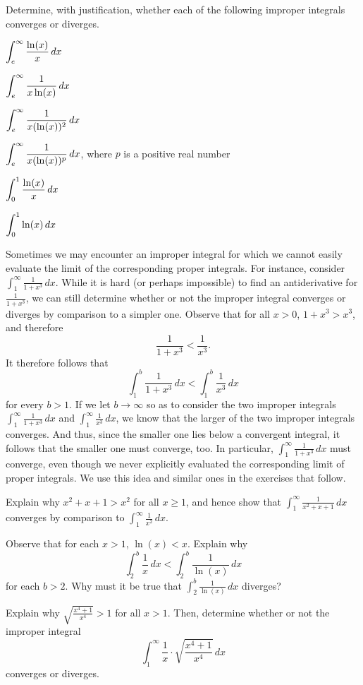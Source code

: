 \begin{exercises} 
  \item Determine, with justification, whether each of the following improper integrals converges or diverges.
  \ba
  	\item $\displaystyle \int_e^{\infty} \frac{\ln(x)}{x} \, dx$
  	\item $\displaystyle \int_e^{\infty} \frac{1}{x\ln(x)} \, dx$
  	\item $\displaystyle \int_e^{\infty} \frac{1}{x(\ln(x))^2} \, dx$	
  	\item $\displaystyle \int_e^{\infty} \frac{1}{x(\ln(x))^p} \, dx$, where $p$ is a positive real number	
	\item $\displaystyle \int_0^1 \frac{\ln(x)}{x} \, dx$
	\item $\displaystyle \int_0^1 \ln(x) \, dx$
  \ea
  
  \item Sometimes we may encounter an improper integral for which we cannot easily evaluate the limit of the corresponding proper integrals.  For instance, consider $\int_1^{\infty} \frac{1}{1+x^3} \, dx$.  While it is hard (or perhaps impossible) to find an antiderivative for $\frac{1}{1+x^3}$, we can still determine whether or not the improper integral converges or diverges by comparison to a simpler one.  Observe that for all $x > 0$, $1 + x^3 > x^3$, and therefore
  $$\frac{1}{1+x^3} < \frac{1}{x^3}.$$
  It therefore follows that 
  $$\int_1^b \frac{1}{1+x^3} \, dx < \int_1^b \frac{1}{x^3} \, dx$$
  for every $b > 1$.  If we let $b \to \infty$ so as to consider the two improper integrals $\int_1^\infty \frac{1}{1+x^3} \, dx$ and $\int_1^\infty \frac{1}{x^3} \, dx$, we know that the larger of the two improper integrals converges.  And thus, since the smaller one lies below a convergent integral, it follows that the smaller one must converge, too.  In particular, $\int_1^\infty \frac{1}{1+x^3} \, dx$ must converge, even though we never explicitly evaluated the corresponding limit of proper integrals.  We use this idea and similar ones in the exercises that follow.
  
  \ba
  	\item Explain why $x^2 + x + 1 > x^2$ for all $x \ge 1$, and hence show that $\int_1^{\infty} \frac{1}{x^2 + x + 1} \, dx$ converges by comparison to $\int_1^{\infty} \frac{1}{x^2} \, dx$.
	\item Observe that for each $x > 1$, $\ln(x) < x$.  Explain why
	$$\int_2^b \frac{1}{x} \, dx < \int_2^b \frac{1}{\ln(x)} \,dx$$
	for each $b > 2$.	Why must it be true that $\int_2^b \frac{1}{\ln(x)} \, dx$ diverges?
	\item Explain why $\sqrt{\frac{x^4+1}{x^4}} > 1$ for all $x > 1$.  Then, determine whether or not the improper integral
	$$\int_1^{\infty} \frac{1}{x} \cdot \sqrt{\frac{x^4+1}{x^4}} \, dx$$
	converges or diverges.
  \ea
  
\end{exercises}
\afterexercises
